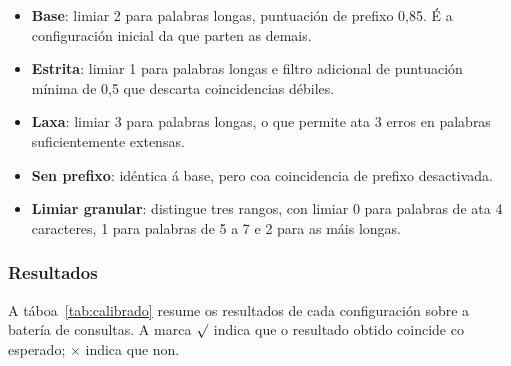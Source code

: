 \documentclass[%
    a4paper,               %
    twoside,               %
    10pt,                  %
]{article}                 %
\begin{document}
\begin{itemize}
    \item \textbf{Base}: limiar 2 para palabras longas, puntuación de prefixo 0,85. É a configuración inicial da que parten as demais.
    \item \textbf{Estrita}: limiar 1 para palabras longas e filtro adicional de puntuación mínima de 0,5 que descarta coincidencias débiles.
    \item \textbf{Laxa}: limiar 3 para palabras longas, o que permite ata 3 erros en palabras suficientemente extensas.
    \item \textbf{Sen prefixo}: idéntica á base, pero coa coincidencia de prefixo desactivada.
    \item \textbf{Limiar granular}: distingue tres rangos, con limiar 0 para palabras de ata 4 caracteres, 1 para palabras de 5 a 7 e 2 para as máis longas.
\end{itemize}

\subsubsection{Resultados}

A táboa~\ref{tab:calibrado} resume os resultados de cada configuración sobre a batería de consultas. A marca $\surd$ indica que o resultado obtido coincide co esperado; $\times$ indica que non.
\end{document}
